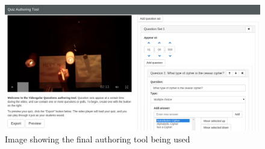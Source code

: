 \begin{landscape}

\begin{figure}[h]
	\centering
		\includegraphics[width=0.8\paperheight]{../figures/authoring_tool_example.png}

	\caption{
		\label{Figure:Authoring_Tool}
		Image showing the final authoring tool being used
	}
\end{figure}

\end{landscape}
